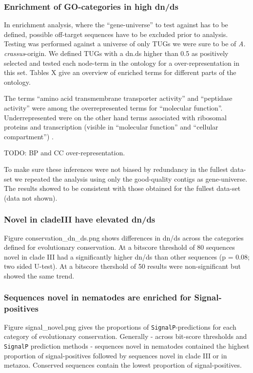 \documentclass[10pt]{bmc_article}
\newenvironment{bmcformat}{\begin{raggedright}\baselineskip20pt\sloppy\setboolean{publ}{false}}{\end{raggedright}\baselineskip20pt\sloppy}
\begin{document}
\begin{bmcformat}
\subsubsection*{Enrichment of GO-categories in high dn/ds}

In enrichment analysis, where the ``gene-universe'' to test against
has to be defined, possible off-target sequences have to be excluded
prior to analysis. Testing was performed against a universe of only
TUGs we were sure to be of \textit{A. crassus}-origin. We defined TUGs
with a dn.ds higher than 0.5 as positively selected and tested each
node-term in the ontology for a over-representation in this set. Tables
X give an overview of enriched terms for different parts of the
ontology.

The terms ``amino acid transmembrane transporter activity'' and
``peptidase activity'' were among the overrepresented terms for
``molecular function''. Underrepresented were on the other hand terms
associated with ribosomal proteins and transcription (visible in
``molecular function'' and ``cellular compartment'') .

TODO: BP and CC over-representation. 

To make sure these inferences were not biased by redundancy in the
fullest data-set we repeated the analysis using only the good-quality
contigs as gene-universe. The results showed to be consistent with
those obtained for the fullest data-set (data not shown).

\subsubsection*{Novel in cladeIII have elevated dn/ds}



Figure conservation\_dn\_ds.png shows differences in dn/ds across the
categories defined for evolutionary conservation. At a bitscore
threshold of 80 sequences novel in clade III had a significantly
higher dn/ds than other sequences (p =
0.08; two sided U-test). At a
bitscore thershold of 50 results were non-significant but showed the
same trend.

\subsubsection*{Sequences novel in nematodes are enriched for
  Signal-positives}


Figure signal\_novel.png gives the proportions of
\texttt{SignalP}-predictions for each category of evolutionary
conservation. Generally - across bit-score thresholds and
\texttt{SignalP} prediction methods - sequences novel in nematodes
contained the highest proportion of signal-positives followed by
sequences novel in clade III or in metazoa. Conserved sequences
contain the lowest proportion of signal-positives.


\end{bmcformat}
\end{document}
